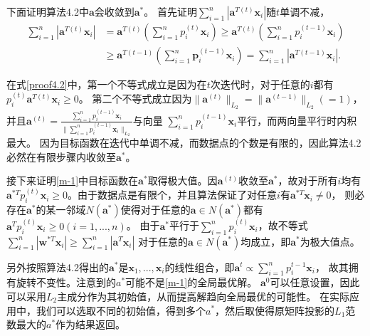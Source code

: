 下面证明算法4.2中$\bm a$会收敛到$\bm a^*$。
首先证明$\sum_{i=1}^n |\bm a^{T(t)}\bm x_i|$随$t$单调不减，
\begin{equation}
\begin{split}
     \sum_{i=1}^n |\bm a^{T(t)} \bm x_i| &= \bm a^{T(t)} (\sum_{i=1}^n p_i^{(t)}\bm x_i) 
     \geq \bm a^{T(t)}(\sum_{i=1}^n p_i^{(t-1)}\bm x_i)\\
     &\geq \bm a^{T(t-1)}(\sum_{i=1}^n\bm p_i^{(t-1)} \bm x_i) = \sum_{i=1}^n |\bm a^{T(t-1)}\bm x_i|.
\end{split}
\label{proof4.2}
\end{equation}

在式\eqref{proof4.2}中，第一个不等式成立是因为在$t$次迭代时，对于任意的$i$都有$p_i^{(t)}\bm a^{T(t)}\bm x_i \geq 0$。
第二个不等式成立因为$\| \bm a^{(t)}\|_{L_2} = \| \bm a^{(t-1)}\|_{L_2} (= 1)$，并且$\bm a^{(t)} = 
\frac{\sum_{i=1}^n p_i^{(t-1)}\bm x_i}{\| \sum_{i=1}^n p_i^{(t-1)}\bm x_i\|_{L_2}}$与向量
$\sum_{i=1}^n p_i^{(t-1)}\bm x_i$平行，而两向量平行时内积最大。
因为目标函数在迭代中单调不减，而数据点的个数是有限的，因此算法4.2必然在有限步骤内收敛至$\bm a^*$。

接下来证明\eqref{m-1}中目标函数在$\bm a^*$取得极大值。因$\bm a^{(t)}$收敛至$\bm a^*$，故对于所有$i$均有
$\bm a^{*T} p_i^{(t)} \bm x_i \geq 0$。由于数据点是有限个，并且算法保证了对任意$i$有$\bm a^{*T}\bm x_i \neq 0$，
则必存在$\bm a^*$的某一邻域$N(\bm a^*)$使得对于任意的$\bm a \in N(\bm a^*)$都有$\bm a^Tp_i^{(t)}\bm x_i \geq 0(i = 1, ..., n)$。
由于$\bm a^*$平行于$\sum_{i=1}^n p_i^{(t)}\bm x_i$，故不等式$\sum_{i=1}^n |\bm w^{*T} \bm x_i| \geq \sum_{i=1}^n |\bm a^T\bm x_i|$
对于任意的$\bm a \in N(\bm a^*)$均成立，即$\bm a^*$为极大值点。

另外按照算法4.2得出的$\bm a^*$是$\bm x_1, ..., \bm x_i$的线性组合，即$\bm a^t \propto \sum_{i=1}^np_i^{t-1}\bm x_i$，
故其拥有旋转不变性。注意到的$a^*$可能不是\eqref{m-1}的全局最优解。
$\bm a^0$可以任意设置，因此可以采用$L_2$主成分作为其初始值，从而提高解趋向全局最优的可能性。
在实际应用中，我们可以选取不同的初始值，得到多个$a^*$，然后取使得原矩阵投影的$L_1$范数最大的$a^*$作为结果返回。

